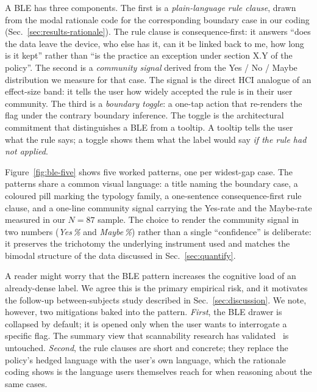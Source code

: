 \documentclass[11pt,a4paper]{article}
\begin{document}
A BLE has three components. The first is a \emph{plain-language
rule clause}, drawn from the modal rationale code for the
corresponding boundary case in our coding (Sec.~\ref{sec:results-rationale}).
The rule clause is consequence-first: it answers ``does the data
leave the device, who else has it, can it be linked back to me,
how long is it kept'' rather than ``is the practice an exception
under section X.Y of the policy''. The second is a \emph{community
signal} derived from the Yes / No / Maybe distribution we measure
for that case. The signal is the direct HCI analogue of an
effect-size band: it tells the user how widely accepted the rule
is in their user community. The third is a \emph{boundary toggle}:
a one-tap action that re-renders the flag under the contrary
boundary inference. The toggle is the architectural commitment that
distinguishes a BLE from a tooltip. A tooltip tells the user what
the rule says; a toggle shows them what the label would say
\emph{if the rule had not applied}.

Figure~\ref{fig:ble-five} shows five worked patterns, one per
widest-gap case. The patterns share a common visual language: a
title naming the boundary case, a coloured pill marking the
typology family, a one-sentence consequence-first rule clause, and
a one-line community signal carrying the Yes-rate and the
Maybe-rate measured in our $N{=}87$ sample.
The choice to render the community signal in two numbers
(\emph{Yes\,\%} and \emph{Maybe\,\%}) rather than a single
``confidence'' is deliberate: it preserves the trichotomy the
underlying instrument used and matches the bimodal structure of
the data discussed in Sec.~\ref{sec:quantify}.



A reader might worry that the BLE pattern increases the cognitive
load of an already-dense label. We agree this is the primary
empirical risk, and it motivates the follow-up between-subjects
study described in Sec.~\ref{sec:discussion}. We note, however, two
mitigations baked into the pattern. \emph{First}, the BLE drawer is
collapsed by default; it is opened only when the user wants to
interrogate a specific flag. The summary view that scannability
research has validated~\citep{kelley:etal:2010,schaub:etal:2015} is
untouched. \emph{Second}, the rule clauses are short and concrete;
they replace the policy's hedged language with the user's own
language, which the rationale coding shows is the language users
themselves reach for when reasoning about the same cases.
\end{document}
